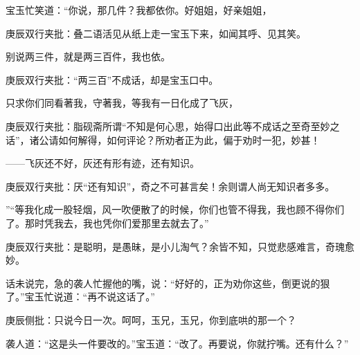 \begin{parag}
    宝玉忙笑道：“你说，那几件？我都依你。好姐姐，好亲姐姐，\begin{note}庚辰双行夹批：叠二语活见从纸上走一宝玉下来，如闻其呼、见其笑。\end{note}别说两三件，就是两三百件，我也依。\begin{note}庚辰双行夹批：“两三百”不成话，却是宝玉口中。\end{note}只求你们同看著我，守著我，等我有一日化成了飞灰，\begin{note}庚辰双行夹批：脂砚斋所谓“不知是何心思，始得口出此等不成话之至奇至妙之话”，诸公请如何解得，如何评论？所劝者正为此，偏于劝时一犯，妙甚！\end{note}——飞灰还不好，灰还有形有迹，还有知识。\begin{note}庚辰双行夹批：厌“还有知识”，奇之不可甚言矣！余则谓人尚无知识者多多。\end{note}”“等我化成一股轻烟，风一吹便散了的时候，你们也管不得我，我也顾不得你们了。那时凭我去，我也凭你们爱那里去就去了。”\begin{note}庚辰双行夹批：是聪明，是愚昧，是小儿淘气？余皆不知，只觉悲感难言，奇瑰愈妙。\end{note}话未说完，急的袭人忙握他的嘴，说：“好好的，正为劝你这些，倒更说的狠了。”宝玉忙说道：“再不说这话了。”\begin{note}庚辰侧批：只说今日一次。呵呵，玉兄，玉兄，你到底哄的那一个？\end{note}袭人道：“这是头一件要改的。”宝玉道：“改了。再要说，你就拧嘴。还有什么？”
\end{parag}


